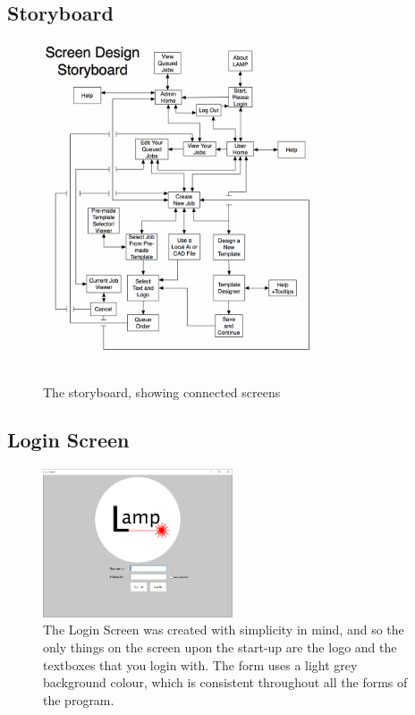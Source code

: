 \documentclass[oneside,openany,11pt,a4paper]{report}
\begin{document}
\centering
\subsection{Storyboard}
\begin{figure}[H]
\includegraphics[width=0.8\textwidth]{sd1.png}
\caption{The storyboard, showing connected screens}
\end{figure}


\subsection{Login Screen}
\begin{figure}[H]
\centering
\includegraphics[width=0.5\textwidth]{sd2.png}
\caption{The Login Screen was created with simplicity in mind, and so the only things on the screen upon the start-up are the logo and the textboxes that you login with. The form uses a light grey background colour, which is consistent throughout all the forms of the program.}
\end{figure}
\end{document}
